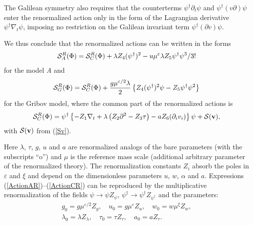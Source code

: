 \documentclass[12pt]{article}
\def\S{{\cal S}}
\def\bfv{{\bf v}}
\begin{document}
The Galilean symmetry also requires that the counterterms
$\psi^{\dag}\partial_{t}\psi$ and $\psi^{\dag} (v\partial) \psi $
enter the renormalized action only in the form of the Lagrangian
derivative $\psi^{\dag}\nabla_{t}\psi$, imposing no restriction on
the Galilean invariant term $\psi^{\dag} (\partial v) \psi $.


We thus conclude that the renormalized actions can be written in the forms
\begin{eqnarray}
\S_{A}^{R}(\Phi) = \S_{C}^{R}(\Phi) +
\lambda Z_{4}  (\psi^{\dag})^{2} -
u\mu^{\varepsilon} \lambda Z_{5}  \psi^{\dag} \psi^{3} /3!
\label{ActionAR}
\end{eqnarray}
for the model {\it A} and
\begin{eqnarray}
\S_{G}^{R}(\Phi) = \S_{C}^{R}(\Phi)
+ \frac{g\mu^{\varepsilon/2}\lambda}{2} \left\{ Z_{4}(\psi^{\dagger})^2\psi
- Z_{5} \psi^{\dagger}\psi^2  \right\}
\label{ActionGR}
\end{eqnarray}
for the Gribov model, where the common part of the
renormalized actions is
\begin{eqnarray}
\S_{C}^{R}(\Phi) =  \psi^{\dag} \left\{
- Z_{1} \nabla_{t} + \lambda\left( Z_{2} \partial^{2}- Z_{3}\tau\right)
- a Z_{6} (\partial_{i}v_{i}) \right\} \psi +  \S(\bfv),
\label{ActionCR}
\end{eqnarray}
with $\S(\bfv)$ from (\ref{Sv}).

Here $\lambda$, $\tau$, $g$, $u$ and $a$ are renormalized analogs of the
bare parameters (with the subscripts ``o'') and $\mu$ is the reference mass
scale (additional arbitrary parameter of the renormalized theory). The
renormalization constants $Z_{i}$ absorb the poles in $\varepsilon$ and $\xi$ and
depend on the dimensionless parameters $u$, $w$, $\alpha$ and $a$.
Expressions (\ref{ActionAR})--(\ref{ActionCR}) can be reproduced by the
multiplicative renormalization of the fields $\psi \to \psi Z_{\psi}$,
$\psi^{\dag} \to \psi^{\dag} Z_{\psi^{\dag}}$
and the parameters:
\begin{eqnarray}
g_{0} = g \mu^{\varepsilon/2} Z_{g}, \quad u_{0} = g \mu^{\varepsilon} Z_{u}, \quad
w_{0} = w \mu^{\xi} Z_{w}, \nonumber \\
\lambda_{0} = \lambda Z_{\lambda}, \quad
\tau_{0} = \tau Z_{\tau},  \quad  a_{0} = a Z_{\tau}.
\label{Multy}
\end{eqnarray}
\end{document}
